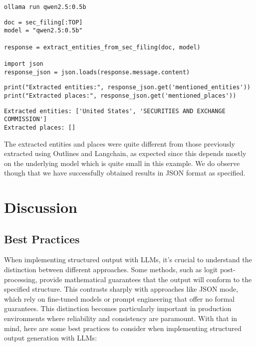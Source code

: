 \begin{verbatim}
ollama run qwen2.5:0.5b
\end{verbatim}

\begin{verbatim}
doc = sec_filing[:TOP]
model = "qwen2.5:0.5b"

response = extract_entities_from_sec_filing(doc, model)

import json
response_json = json.loads(response.message.content)
\end{verbatim}

\begin{verbatim}
print("Extracted entities:", response_json.get('mentioned_entities'))
print("Extracted places:", response_json.get('mentioned_places'))
\end{verbatim}

\begin{verbatim}
Extracted entities: ['United States', 'SECURITIES AND EXCHANGE COMMISSION']
Extracted places: []
\end{verbatim}

The extracted entities and places were quite different from those previously extracted using Outlines and Langchain, as expected since this depends mostly on the underlying model which is quite small in this example. We do observe though that we have successfully obtained results in JSON format as specified.

\section{Discussion}

\subsection{Best Practices}

When implementing structured output with LLMs, it's crucial to understand the distinction between different approaches. Some methods, such as logit post-processing, provide mathematical guarantees that the output will conform to the specified structure. This contrasts sharply with approaches like JSON mode, which rely on fine-tuned models or prompt engineering that offer no formal guarantees. This distinction becomes particularly important in production environments where reliability and consistency are paramount. With that in mind, here are some best practices to consider when implementing structured output generation with LLMs:

